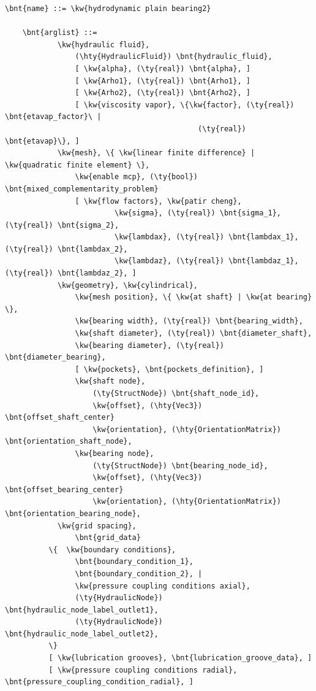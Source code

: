 \begin{Verbatim}[commandchars=\\\{\}]
    \bnt{name} ::= \kw{hydrodynamic plain bearing2}

    \bnt{arglist} ::=
            \kw{hydraulic fluid},
                (\hty{HydraulicFluid}) \bnt{hydraulic_fluid},
                [ \kw{alpha}, (\ty{real}) \bnt{alpha}, ]
                [ \kw{Arho1}, (\ty{real}) \bnt{Arho1}, ]
                [ \kw{Arho2}, (\ty{real}) \bnt{Arho2}, ]
                [ \kw{viscosity vapor}, \{\kw{factor}, (\ty{real}) \bnt{etavap_factor}\ |
                                            (\ty{real}) \bnt{etavap}\}, ]
            \kw{mesh}, \{ \kw{linear finite difference} | \kw{quadratic finite element} \},
                \kw{enable mcp}, (\ty{bool}) \bnt{mixed_complementarity_problem}
                [ \kw{flow factors}, \kw{patir cheng},
                         \kw{sigma}, (\ty{real}) \bnt{sigma_1}, (\ty{real}) \bnt{sigma_2},
                         \kw{lambdax}, (\ty{real}) \bnt{lambdax_1}, (\ty{real}) \bnt{lambdax_2},
                         \kw{lambdaz}, (\ty{real}) \bnt{lambdaz_1}, (\ty{real}) \bnt{lambdaz_2}, ]
            \kw{geometry}, \kw{cylindrical},
                \kw{mesh position}, \{ \kw{at shaft} | \kw{at bearing} \},
                \kw{bearing width}, (\ty{real}) \bnt{bearing_width},
                \kw{shaft diameter}, (\ty{real}) \bnt{diameter_shaft},
                \kw{bearing diameter}, (\ty{real}) \bnt{diameter_bearing},
                [ \kw{pockets}, \bnt{pockets_definition}, ]
                \kw{shaft node},
                    (\ty{StructNode}) \bnt{shaft_node_id},
                    \kw{offset}, (\hty{Vec3}) \bnt{offset_shaft_center}
                    \kw{orientation}, (\hty{OrientationMatrix}) \bnt{orientation_shaft_node},
                \kw{bearing node},
                    (\ty{StructNode}) \bnt{bearing_node_id},
                    \kw{offset}, (\hty{Vec3}) \bnt{offset_bearing_center}
                    \kw{orientation}, (\hty{OrientationMatrix}) \bnt{orientation_bearing_node},
            \kw{grid spacing},
                \bnt{grid_data}
          \{  \kw{boundary conditions},
                \bnt{boundary_condition_1},
                \bnt{boundary_condition_2}, |
                \kw{pressure coupling conditions axial},
                (\ty{HydraulicNode}) \bnt{hydraulic_node_label_outlet1},
                (\ty{HydraulicNode}) \bnt{hydraulic_node_label_outlet2},
          \}
          [ \kw{lubrication grooves}, \bnt{lubrication_groove_data}, ]
          [ \kw{pressure coupling conditions radial}, \bnt{pressure_coupling_condition_radial}, ]

\end{Verbatim}
